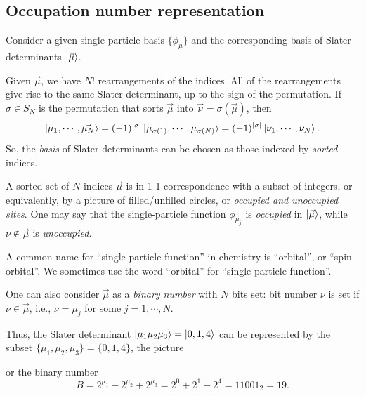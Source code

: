 \documentclass{report}
\theoremstyle{plain}
\theoremstyle{definition}
\begin{document}
\subsection{Occupation number representation}

Consider a given single-particle basis $\{\phi_\mu\}$ and the
corresponding basis of Slater determinants $\ket{\vec{\mu}}$.

Given $\vec{\mu}$, we have $N!$ rearrangements of the indices. All of
the rearrangements give rise to the same Slater determinant, up to the
sign of the permutation. If $\sigma\in S_N$ is the permutation that
sorts $\vec{\mu}$ into $\vec{\nu} = \sigma(\vec{\mu})$, then
\begin{equation}
  \ket{\mu_1,\cdots,\vec{\mu_N}} = (-1)^{|\sigma|}
  \ket{\mu_{\sigma(1)},\cdots,\mu_{\sigma(N)}} = (-1)^{|\sigma|}
  \ket{\nu_1,\cdots,\nu_N}.
\end{equation}
So, the \emph{basis} of Slater determinants can be chosen as those
indexed by \emph{sorted} indices.

A sorted set of $N$ indices $\vec{\mu}$ is in 1-1 correspondence with
a subset of integers, or
equivalently, by a picture of filled/unfilled circles, or
\emph{occupied and unoccupied sites}. One may say that the
single-particle function $\phi_{\mu_j}$ is \emph{occupied} in
$\ket{\vec{\mu}}$, while $\nu\notin\vec{\mu}$ is
\emph{unoccupied}.

A common name for ``single-particle function'' in chemistry is
``orbital'', or ``spin-orbital''. We sometimes use the word
``orbital'' for ``single-particle function''.

One can also consider $\vec{\mu}$ as a \emph{binary number} with $N$
bits set: bit number $\nu$ is set if $\nu \in \vec{\mu}$, i.e., $\nu
= \mu_j$ for some $j=1,\cdots,N$. 

Thus, the Slater determinant $\ket{\mu_1\mu_2\mu_3}=\ket{0,1,4}$ can be
represented by the subset $\{\mu_1,\mu_2,\mu_3\} = \{0,1,4\}$, the
picture 
\begin{center}
\end{center}

or the binary number
\begin{equation}
  B = 2^{\mu_1} + 2^{\mu_2} + 2^{\mu_3} = 2^0 + 2^1 + 2^4 =
  11001_2 = 19.
\end{equation}
\end{document}

